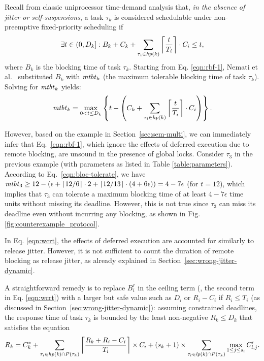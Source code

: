 Recall from classic uniprocessor time-demand analysis that, \emph{in the absence of jitter or self-suspensions}, a task $\tau_k$ is considered schedulable under non-preemptive fixed-priority scheduling if
\begin{equation}
\label{eqn:rbf-1}
\exists t \in (0,D_k]: B_k+ C_k + \sum_{\tau_i \in \mathit{hp}(k)} \left \lceil \frac{t}{T_i} \right \rceil \cdot C_i \leq t,
\end{equation}
where $B_k$ is the blocking time of task $\tau_k$.
Starting from Eq. \eqref{eqn:rbf-1}, Nemati et al.~\cite{NBN:11} substituted  $B_k$ with $\mathit{mtbt}_k$ (the maximum tolerable blocking time of task $\tau_k$). Solving for $\mathit{mtbt}_k$ yields:
\begin{equation}
\label{eqn:bloc-tolerate}
\mathit{mtbt}_k = \max_{0<t \leq D_k} \left\{ t - \left( C_k + \sum_{\tau_i \in \mathit{hp}(k)} \left \lceil \frac{t}{T_i} \right \rceil \cdot C_i \right) \right\}.
\end{equation}

However, based on the example in Section~\ref{sec:sem-multi}, we can immediately infer that Eq.~\eqref{eqn:rbf-1}, which ignore the effects of deferred execution due to remote blocking, are unsound in the presence of global locks. Consider $\tau_3$ in the previous example (with parameters as listed in Table \ref{table:parameters}). According to Eq.~\eqref{eqn:bloc-tolerate}, we have $\mathit{mtbt}_3 \geq 12 - (\epsilon + \lceil 12 / 6 \rceil \cdot 2 + \lceil 12 / 13 \rceil \cdot (4+6\epsilon)) = 4-7\epsilon$ (for $t=12$), which implies that $\tau_3$ can tolerate a maximum blocking time of at least $4-7\epsilon$ time units without missing its deadline. However, this is not true since $\tau_3$ can miss its deadline even without incurring any blocking, as shown in Fig. \ref{fig:counterexample_protocol}. 

\label{sec:safe_bound}

In Eq. \eqref{eqn:wcrt}, the effects of deferred execution  are accounted for similarly to release jitter. However, it is not sufficient to count the duration of remote blocking as release jitter, as already explained in Section~\ref{sec:wrong-jitter-dynamic}.

A straightforward remedy is to replace $B_i^r$ in the ceiling term (\ie, the second term in Eq. \eqref{eqn:wcrt}) with a larger but safe value such as $D_i$  or $R_i - C_i$ if $R_i \leq T_i$ (as discussed in Section~\ref{sec:wrong-jitter-dynamic}): assuming constrained deadlines, the response time of task $\tau_k$ is bounded by the least non-negative $R_k \leq D_k$ that satisfies the equation
\begin{equation}
\label{eqn:wcrt-pfp-fixed}
R_k = C_k^{\ast} + \sum_{\tau_i \in \mathit{hp(k)} \cap P(\tau_k)} \left \lceil \frac{R_k + R_i - C_i}{T_i} \right \rceil \times C_i + (s_k+1) \times \sum_{\tau_l \in \mathit{lp(k)} \cap P(\tau_k)} \max_{1 \leq j \leq s_l} C_{l,j}^{\prime}.
\end{equation}


